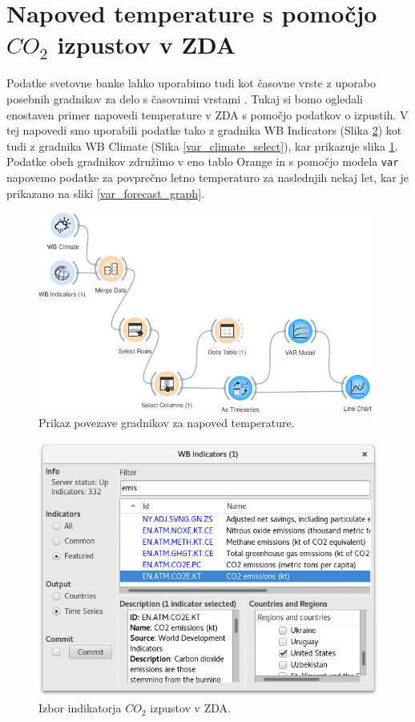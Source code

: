 \section{Napoved temperature s pomočjo $CO_2$ izpustov v ZDA}


Podatke svetovne banke lahko uporabimo tudi kot časovne vrste z uporabo
posebnih gradnikov za delo s časovnimi vrstami \cite{time_series}. Tukaj si
bomo ogledali enostaven primer napovedi temperature v ZDA s pomočjo podatkov o
izpustih. V tej napovedi smo uporabili podatke tako z gradnika WB Indicators
(Slika \ref{var_indicator_select})
kot tudi z gradnika WB Climate (Slika \ref{var_climate_select}), 
kar prikazuje slika \ref{var_setup}. Podatke obeh gradnikov združimo v eno 
tablo Orange in s pomočjo modela \verb|var| napovemo podatke za povprečno 
letno temperaturo za naslednjih nekaj let, kar je prikazano na sliki 
\ref{var_forecast_graph}.

\begin{figure}
\begin{center}
\includegraphics[width=11cm]{pic/var_setup.png}
\end{center}
\caption{Prikaz povezave gradnikov za napoved temperature.}
\label{var_setup}
\end{figure} 


\begin{figure}
\begin{center}
\includegraphics[width=12cm]{pic/var_indicator_select.png}
\end{center}
\caption{Izbor indikatorja $CO_2$ izpustov v ZDA.}
\label{var_indicator_select}
\end{figure} 

